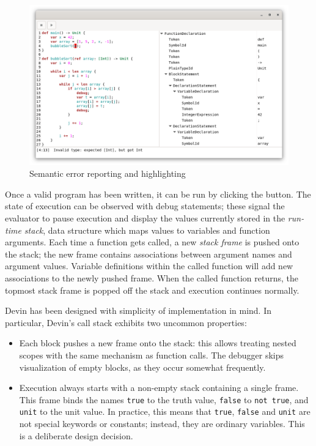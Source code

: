 \documentclass[11pt, american, draft]{PhdThesis}
\begin{document}
  \begin{figure}[H]
    \center
    \includegraphics[width=0.9\linewidth]{4.png}
    \caption{Semantic error reporting and highlighting}
  \end{figure}

  Once a valid program has been written, it can be run by clicking the {\faPlay} button. The state
  of execution can be observed with debug statements; these signal the evaluator to pause execution
  and display the values currently stored in the \emph{run-time stack}, data structure which maps
  values to variables and function arguments. Each time a function gets called, a new \emph{stack
  frame} is pushed onto the stack; the new frame contains associations between argument names and
  argument values. Variable definitions within the called function will add new associations to the
  newly pushed frame. When the called function returns, the topmost stack frame is popped off the
  stack and execution continues normally.

  Devin has been designed with simplicity of implementation in mind. In particular, Devin's call
  stack exhibits two uncommon properties:

  \begin{itemize}[noitemsep,topsep=0pt]
    \item Each block pushes a new frame onto the stack: this allows treating nested scopes with the
          same mechanism as function calls. The debugger skips visualization of empty blocks, as
          they occur somewhat frequently.

    \item Execution always starts with a non-empty stack containing a single frame. This frame binds
          the names \verb$true$ to the truth value, \verb$false$ to \verb$not true$, and \verb$unit$
          to the unit value. In practice, this means that \verb$true$, \verb$false$ and \verb$unit$
          are not special keywords or constants; instead, they are ordinary variables. This is a
          deliberate design decision.
  \end{itemize}
\end{document}
